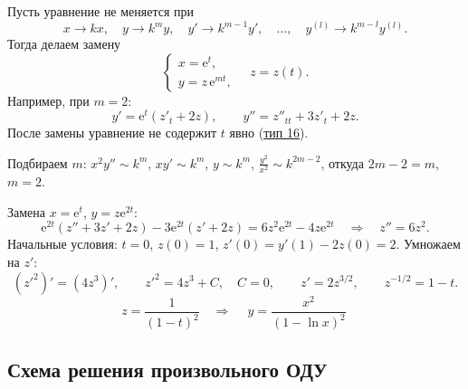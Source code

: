 \documentclass[12pt,a4paper]{article}
\numberwithin{equation}{section}
\newcommand{\e}{\mathrm{e}}
\begin{document}
\label{box:type19}
\begin{definitionHSE}
Пусть уравнение не меняется при
\[
x\to kx,\quad y\to k^my,\quad y'\to k^{m-1}y',\quad \ldots,\quad y^{(l)}\to k^{m-l}y^{(l)}.
\]
Тогда делаем замену
\[
\begin{cases}x=\e^t,\\ y=z\,\e^{mt},\end{cases}\quad z=z(t).
\]
Например, при $m=2$:
\[
y'=\e^t(z'_t+2z),\qquad y''=z''_{tt}+3z'_t+2z.
\]
После замены уравнение не содержит $t$ явно (\hyperref[box:type16]{тип 16}).
\end{definitionHSE}

\begin{exampleHSE}[\(x^2y''-3xy'=\dfrac{6y^2}{x^2}-4y,\ y(1)=1,\ y'(1)=4\)]
Подбираем $m$: $x^2y''\sim k^m$, $xy'\sim k^m$, $y\sim k^m$, $\frac{y^2}{x^2}\sim k^{2m-2}$, откуда $2m-2=m$, $m=2$.

Замена $x=\e^t$, $y=z\e^{2t}$:
\[
\e^{2t}(z''+3z'+2z)-3\e^{2t}(z'+2z)=6z^2\e^{2t}-4z\e^{2t}\quad\Longrightarrow\quad z''=6z^2.
\]
Начальные условия: $t=0$, $z(0)=1$, $z'(0)=y'(1)-2z(0)=2$. Умножаем на $z'$:
\[
(z'^2)'=(4z^3)',\qquad z'^2=4z^3+C,\quad C=0,\qquad z'=2z^{3/2},\qquad z^{-1/2}=1-t.
\]
\[
z=\frac{1}{(1-t)^2}\quad\Longrightarrow\quad
\boxed{\ y=\frac{x^2}{(1-\ln x)^2}\ }
\]
\end{exampleHSE}

\clearpage
{}
\subsection{Схема решения произвольного ОДУ}
\label{sec:ode-scheme}
\end{document}

